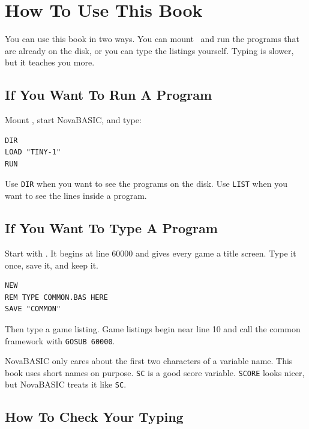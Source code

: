 \chapter*{How To Use This Book}
{}

You can use this book in two ways. You can mount \diskname\ and run the
programs that are already on the disk, or you can type the listings yourself.
Typing is slower, but it teaches you more.

\section*{If You Want To Run A Program}
{}

Mount \diskname, start NovaBASIC, and type:

\begin{lstlisting}
DIR
LOAD "TINY-1"
RUN
\end{lstlisting}

Use \texttt{DIR} when you want to see the programs on the disk. Use
\texttt{LIST} when you want to see the lines inside a program.

\section*{If You Want To Type A Program}
{}

Start with \commonlisting. It begins at line 60000 and gives every game a
title screen. Type it once, save it, and keep it.

\begin{lstlisting}
NEW
REM TYPE COMMON.BAS HERE
SAVE "COMMON"
\end{lstlisting}

Then type a game listing. Game listings begin near line 10 and call the common
framework with \texttt{GOSUB 60000}.

\begin{typeinbox}
NovaBASIC only cares about the first two characters of a variable name. This
book uses short names on purpose. \texttt{SC} is a good score variable.
\texttt{SCORE} looks nicer, but NovaBASIC treats it like \texttt{SC}.
\end{typeinbox}

\section*{How To Check Your Typing}
{}


